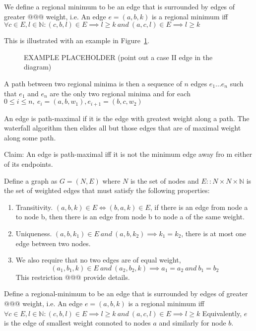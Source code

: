 \documentclass{jfp}
\begin{document}
We define a regional minimum to be an edge that is surrounded by edges of greater @@@
weight, i.e.
An edge $e = (a,b,k)$ is a regional minimum iff
$\forall c \in E, l \in \mathbb{N} :
  (c,b,l) \in E \implies l \geq k\ and\
  (a,c,l) \in E \implies l \geq k $


This is illustrated with an example in Figure~\ref{fig:regmin}.

\begin{figure}
\centering
\ifpdf
\else
\fi
\caption{EXAMPLE PLACEHOLDER (point out a case II edge in the diagram)}
\label{fig:regmin}
\end{figure}

A path between two regional minima is then a sequence of $n$ edges $e_1 ... e_n$
such that $e_1$ and $e_n$ are the only two regional minima
and for each $ 0 \leq i \le n,\ e_i = (a,b,w_1) , e_{i+1} = (b,c,w_2)$

\noindent An edge is path-maximal if it is the edge with greatest weight along a
 path.
The waterfall algorithm then elides all but those edges that are of maximal weight along some path.

\noindent Claim: An edge is path-maximal iff it is not the minimum edge away fro
m either of its endpoints.



Define a graph as $G = (N,E)$
where $N$ is the set of nodes and $E :: N\times N \times \mathbb{N}$ is the set of weighted edges
that must satisfy the following properties:
\begin{enumerate}

\item Transitivity. $(a,b,k) \in E \iff (b,a,k) \in E$, if there is an
  edge from node a to node b, then there is an edge from node b to
  node a of the same weight.

\item Uniqueness.  $(a,b,k_1) \in E\ and\ (a,b,k_2) \implies k_1 =
  k_2$, there is at most one edge between two nodes.

\item We also require that no two edges are of equal weight,
  \[
  (a_1,b_1,k) \in E\ and\ (a_2,b_2,k) \implies a_1 = a_2\ and\ b_1 =
  b_2
  \]
  This restriction @@@ provide details.

\end{enumerate}

Define a regional-minimum to be an edge that is surrounded by edges of
greater @@@ weight, i.e.  An edge $e = (a,b,k)$ is a regional minimum iff
$\forall c \in E, l \in \mathbb{N} : (c,b,l) \in E \implies l \geq
k\ and\ (a,c,l) \in E \implies l \geq k $ Equivalently, $e$ is the
edge of smallest weight connoted to nodes $a$ and similarly for node
$b$.
\end{document}
